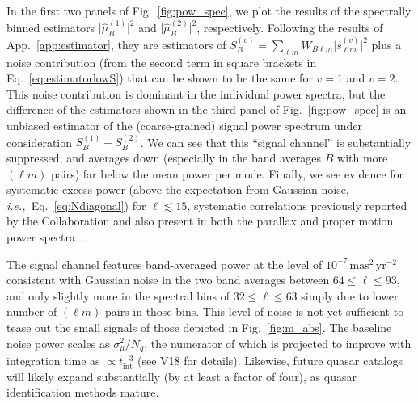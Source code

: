 \documentclass[prd,aps,twocolumn,nofootinbib,superscriptaddress,preprintnumbers,balancelastpage,longbibliography,floatfix]{revtex4-1}
\begin{document}
In the first two panels of Fig.~\ref{fig:pow_spec}, we plot the results of the spectrally binned estimators $\big|\hat{\mu}^{(1)}_{B}\big|^2$ and $\big|\hat{\mu}^{(2)}_{B}\big|^2$, respectively. Following the results of App.~\ref{app:estimator}, they are estimators of $S^{(v)}_B = \sum_{\ell m} W_{B \ell m} \big|s_{\ell m}^{(v)}\big|^2$ plus a noise contribution (from the second term in square brackets in Eq.~\ref{eq:estimatorlowS}) that can be shown to be the same for $v=1$ and $v=2$. This noise contribution is dominant in the individual power spectra, but the difference of the estimators shown in the third panel of Fig.~\ref{fig:pow_spec} is an unbiased estimator of the (coarse-grained) signal power spectrum under consideration $S^{(1)}_B - S^{(2)}_B$. We can see that this ``signal channel'' is substantially suppressed, and averages down (especially in the band averages $B$ with more $(\ell m)$ pairs) far below the mean power per mode. Finally, we see evidence for systematic excess power (above the expectation from Gaussian noise, \emph{i.e.,}~Eq.~\ref{eq:Ndiagonal}) for $\ell \lesssim 15$, systematic correlations previously reported by the \Gaia Collaboration and also present in both the parallax and proper motion power spectra~\cite{lindegren2018gaia,Undefined:2018amf}.


The signal channel features band-averaged power at the level of $10^{-7}\,\mathrm{mas^2\,\mathrm{yr}^{-2}}$ consistent with Gaussian noise in the two band averages between $64 \le \ell \le 93$, and only slightly more in the spectral bins of $32 \le \ell \le 63$ simply due to lower number of $(\ell m)$ pairs in those bins. This level of noise is not yet sufficient to tease out the small signals of those depicted in Fig.~\ref{fig:m_abs}. The baseline noise power scales as $\sigma_{\mu}^2/N_q$, the numerator of which is projected to improve with integration time as $\propto t_\mathrm{int}^{-3}$ (see V18 for details). Likewise, future \Gaia quasar catalogs will likely expand substantially (by at least a factor of four), as quasar identification methods mature.
\end{document}
